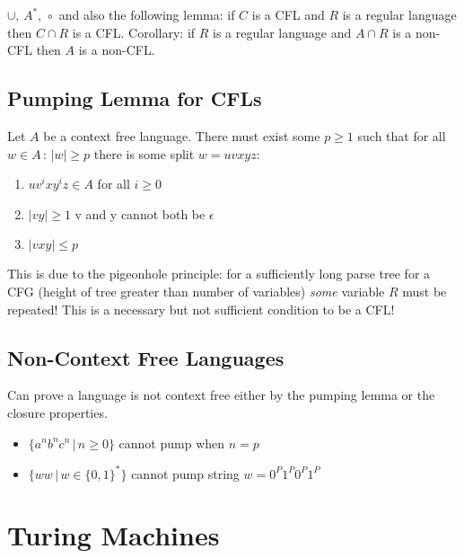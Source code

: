 $\cup,\, A^* ,\, \circ$ and also the following lemma: if $C$ is a CFL and $R$ is a regular language then $C\cap R$ is a CFL. Corollary: if $R$ is a regular language and $A\cap R$ is a non-{}CFL then $A$ is a non-{}CFL.

\subsection{Pumping Lemma for CFLs}
\label{pumpinglemmaforcfls}

Let $A$ be a context free language. There must exist some $p \geq 1 $ such that for all $w\in A\, :\, |w| \geq p$ there is some split $w = uvxyz$:

\begin{enumerate}
\item $ uv^ixy^iz \in A $ for all $i\geq 0$

\item $ |vy| \geq 1 $ v and y cannot both be $\epsilon$

\item $ |vxy| \leq p$

\end{enumerate}

This is due to the pigeonhole principle: for a sufficiently long parse tree for a CFG (height of tree greater than number of variables) \emph{some} variable $R$ must be repeated!
This is a necessary but not sufficient condition to be a CFL!

\subsection{Non-{}Context Free Languages}
\label{non-contextfreelanguages}

Can prove a language is not context free either by the pumping lemma or the closure properties.

\begin{itemize}
\item $\{ a^nb^nc^n\, |\, n \geq 0 \}$ cannot pump when $n = p$

\item $\{ ww\, |\, w\in \{0,1\}^* \}$ cannot pump string $w = 0^P1^P0^P1^P$

\end{itemize}

\section{Turing Machines}
\label{turingmachines}

